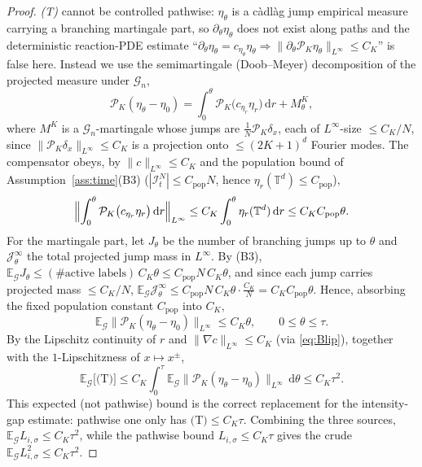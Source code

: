 \documentclass[a4paper,fleqn]{cas-sc}
\theoremstyle{definition}
\theoremstyle{remark}
\begin{document}
\begin{proof}
\emph{(T)} cannot be controlled pathwise: $\eta_\theta$ is a c\`adl\`ag jump
empirical measure carrying a branching martingale part, so $\partial_\theta\eta_\theta$
does not exist along paths and the deterministic reaction-PDE estimate
``$\partial_\theta\eta_\theta=c_{\eta_\theta}\eta_\theta\Rightarrow
\|\partial_\theta\mathcal P_K\eta_\theta\|_{L^\infty}\le C_K$'' is false here.
Instead we use the semimartingale (Doob--Meyer) decomposition of the projected
measure under $\mathcal G_n$,
\[
\mathcal P_K(\eta_\theta-\eta_0)
=\int_0^\theta\mathcal P_K\bigl(c_{\eta_r}\eta_r\bigr)\,\mathrm dr+M^K_\theta,
\]
where $M^K$ is a $\mathcal G_n$-martingale whose jumps are $\frac1N\mathcal P_K\delta_x$,
each of $L^\infty$-size $\le C_K/N$, since $\|\mathcal P_K\delta_x\|_{L^\infty}\le C_K$ is
a projection onto $\le(2K+1)^d$ Fourier modes. The compensator obeys, by $\|c\|_{L^\infty}\le C_K$
and the population bound of Assumption~\ref{ass:time}(B3)
($|\mathcal I^N_t|\le C_{\mathrm{pop}}N$, hence $\eta_r(\mathbb T^d)\le C_{\mathrm{pop}}$),
\[
\Bigl\|\int_0^\theta\mathcal P_K\bigl(c_{\eta_r}\eta_r\bigr)\,\mathrm dr\Bigr\|_{L^\infty}
\le C_K\int_0^\theta\eta_r(\mathbb T^d)\,\mathrm dr\le C_KC_{\mathrm{pop}}\theta.
\]
For the martingale part, let $J_\theta$ be the number of branching jumps up to $\theta$ and
$\mathcal J^{\infty}_\theta$ the total projected jump mass in $L^\infty$. By (B3),
$\mathbb E_{\mathcal G}J_\theta\le(\#\text{active labels})\,C_K\theta\le C_{\mathrm{pop}}N\,C_K\theta$, and since
each jump carries projected mass $\le C_K/N$,
$\mathbb E_{\mathcal G}\mathcal J^{\infty}_\theta\le C_{\mathrm{pop}}N\,C_K\theta\cdot\frac{C_K}{N}=C_KC_{\mathrm{pop}}\theta$.
Hence, absorbing the fixed population constant $C_{\mathrm{pop}}$ into $C_K$,
\[
\mathbb E_{\mathcal G}\bigl\|\mathcal P_K(\eta_\theta-\eta_0)\bigr\|_{L^\infty}\le C_K\theta,
\qquad 0\le\theta\le\tau.
\]
By the Lipschitz continuity of $r$ and $\|\nabla c\|_{L^\infty}\le C_K$
(via \eqref{eq:Blip}), together with the $1$-Lipschitzness of $x\mapsto x^\pm$,
\[
\mathbb E_{\mathcal G}\bigl[\text{(T)}\bigr]
\le C_K\int_0^\tau\mathbb E_{\mathcal G}\bigl\|\mathcal P_K(\eta_\theta-\eta_0)\bigr\|_{L^\infty}\,\mathrm d\theta
\le C_K\tau^2 .
\]
This expected (not pathwise) bound is the correct replacement for the
intensity-gap estimate: pathwise one only has $\text{(T)}\le C_K\tau$. Combining
the three sources, $\mathbb E_{\mathcal G}L_{i,\sigma}\le C_K\tau^2$, while the
pathwise bound $L_{i,\sigma}\le C_K\tau$ gives the crude
$\mathbb E_{\mathcal G}L_{i,\sigma}^2\le C_K\tau^2$.


\end{proof}
\end{document}

